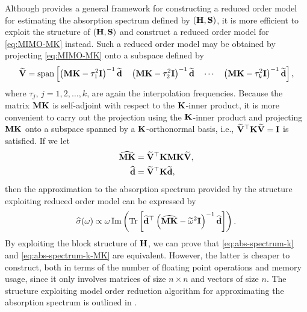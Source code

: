 Although  provides a general framework for constructing a reduced order model for estimating the absorption spectrum defined by $(\mathbf{H},\mathbf{S})$, it is more efficient to exploit the structure of $(\mathbf{H},\mathbf{S})$ and construct a reduced order model for \eqref{eq:MIMO-MK} instead. Such a reduced order model may be obtained by projecting \eqref{eq:MIMO-MK} onto a subspace defined by
\begin{equation}
  \widetilde{\mathbf{V}} = \mathrm{span}\left[  \left( \mathbf{M}\mathbf{K} - \tau_1^2\mathbf{I} \right)^{-1} \widetilde{\mathbf{d}} \quad
                    \left( \mathbf{M}\mathbf{K} - \tau_2^2\mathbf{I} \right)^{-1} \widetilde{\mathbf{d}} \quad
                     \cdots \quad
                    \left( \mathbf{M}\mathbf{K} - \tau_k^2\mathbf{I} \right)^{-1} \widetilde{\mathbf{d}}  \right],
  \label{eq:defV-MK}
\end{equation}
where $\tau_j$, $j = 1,2,\ldots,k$, are again the interpolation frequencies. Because the matrix $\mathbf{M}\mathbf{K}$ is self-adjoint with respect to the $\mathbf{K}$-inner product, it is more convenient to carry out the projection using the $\mathbf{K}$-inner product and projecting $\mathbf{M}\mathbf{K}$ onto a subspace spanned by a $\mathbf{K}$-orthonormal basis, i.e., $\widetilde{\mathbf{V}}^\top \mathbf{K} \widetilde{\mathbf{V}} = \mathbf{I}$ is satisfied. If we let
\begin{align}
  \widehat{\mathbf{M}\mathbf{K}} &= \widetilde{\mathbf{V}}^\top \mathbf{K} \mathbf{M} \mathbf{K} \widetilde{\mathbf{V}}, \\
  \widehat{\mathbf{d}} &= \widetilde{\mathbf{V}}^\top \mathbf{K} \widetilde{\mathbf{d}},
\end{align}
then the approximation to the absorption spectrum provided by the structure exploiting reduced order model can be expressed by
\begin{equation}
  \widehat{\sigma}(\omega) \propto \omega \operatorname{Im}\left(\operatorname{Tr}\left[ \widehat{\mathbf{d}}^\top \left( \widehat{\mathbf{M}\mathbf{K}} - \widetilde{\omega}^2\mathbf{I} \right)^{-1} \widehat{\mathbf{d}} \right]\right).
  \label{eq:abs-spectrum-k-MK}
\end{equation}
By exploiting the block structure of $\mathbf{H}$, we can prove that \eqref{eq:abs-spectrum-k} and \eqref{eq:abs-spectrum-k-MK} are equivalent. However, the latter is cheaper to construct, both in terms of the number of floating point operations and memory usage, since it only involves matrices of size $n\times n$ and vectors of size $n$. The structure exploiting model order reduction algorithm for approximating the absorption spectrum is outlined in .

